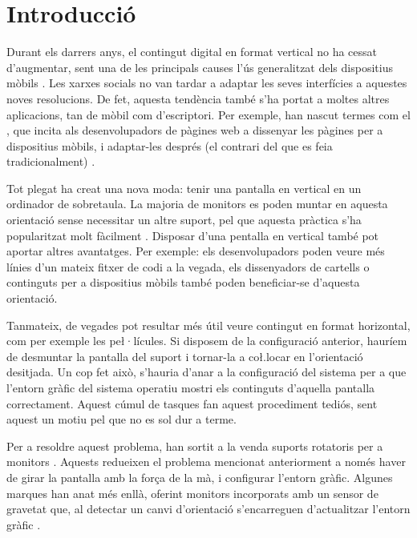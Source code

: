 \chapter{Introducció}
\label{cap:introduccio}

Durant els darrers anys, el contingut digital en format vertical no ha cessat
d'augmentar, sent una de les principals causes l'ús generalitzat dels
dispositius mòbils \cite{Navarro2023El}. Les xarxes socials no van tardar a
adaptar les seves interfícies a aquestes noves resolucions. De fet, aquesta
tendència també s'ha portat a moltes altres aplicacions, tan de mòbil com
d'escriptori. Per exemple, han nascut termes com el
, que incita als desenvolupadors de pàgines web
a dissenyar les pàgines per a dispositius mòbils, i adaptar-les després
(el contrari del que es feia tradicionalment) \cite{varrela2015mobile}.

Tot plegat ha creat una nova moda: tenir una pantalla en vertical
en un ordinador de sobretaula. La majoria de monitors es poden muntar en
aquesta orientació sense necessitar un altre suport, pel que aquesta pràctica
s'ha popularitzat molt fàcilment \cite{WeardenPortrait}.
Disposar d'una pentalla en vertical també pot aportar altres avantatges. Per
exemple: els desenvolupadors poden veure més línies d'un mateix fitxer de codi
a la vegada, els dissenyadors de cartells o continguts per a dispositius mòbils
també poden beneficiar-se d'aquesta orientació.

Tanmateix, de vegades pot resultar més útil veure contingut en format
horizontal, com per exemple les pe\l·lícules. Si disposem de la configuració
anterior, hauríem de desmuntar la pantalla del suport i tornar-la a co\l.locar
en l'orientació desitjada. Un cop fet això, s'hauria d'anar a la configuració
del sistema per a que l'entorn gràfic del sistema operatiu mostri els continguts
d'aquella pantalla correctament. Aquest cúmul de tasques fan aquest procediment
tediós, sent aquest un motiu pel que no es sol dur a terme.

Per a resoldre aquest problema, han sortit a la venda suports rotatoris per a 
monitors \cite{DIGITUSUniversal}. Aquests redueixen el problema mencionat
anteriorment a només haver de girar la pantalla amb la força de la mà, i
configurar l'entorn gràfic. Algunes marques han anat més enllà, oferint
monitors incorporats amb un sensor de gravetat que, al detectar un canvi
d'orientació s'encarreguen d'actualitzar l'entorn gràfic \cite{LCLC}.

